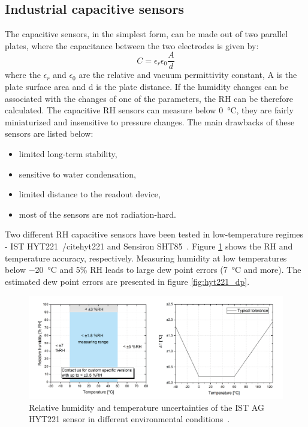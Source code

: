 \subsection{Industrial capacitive sensors}
\label{capacitive_sensors}
The capacitive sensors, in the simplest form, can be made out of two parallel plates, where the capacitance between the two electrodes is given by:
\begin{equation}
C = \epsilon_{r}\epsilon_0\frac{A}{d}
\end{equation}
where the $\epsilon_{r}$ and $\epsilon_{0}$ are the relative and vacuum permittivity constant, A is the plate surface area and d is the plate distance. If the humidity changes can be associated with the changes of one of the parameters, the \gls{RH} can be therefore calculated. 
The capacitive \gls{RH} sensors can measure below \SI{0}{\celsius}, they are fairly miniaturized and insensitive to pressure changes. The main drawbacks of these sensors are listed below:
\begin{itemize}
    \item limited long-term stability,
    \item sensitive to water condensation,
    \item limited distance to the readout device,
    \item most of the sensors are not radiation-hard.
\end{itemize}
Two different \gls{RH} capacitive sensors have been tested in low-temperature regimes - IST HYT221~/cite{hyt221} and Sensiron SHT85~\cite{SHT85}. Figure \ref{fig:hyt221} shows the \gls{RH} and temperature accuracy, respectively. Measuring humidity at low temperatures below \SI{-20}{\celsius} and 5\% \gls{RH} leads to large dew point errors (\SI{7}{\celsius} and more). The estimated dew point errors are presented in figure \ref{fig:hyt221_dp}.
\begin{figure}[!h]
\centering
\includegraphics[width=0.85\columnwidth]{Chapter5/images/hyt221_rh.png}
\caption{Relative humidity and temperature uncertainties of the IST AG HYT221 sensor in different environmental conditions~\cite{hyt221}.}
\label{fig:hyt221}
\end{figure}
